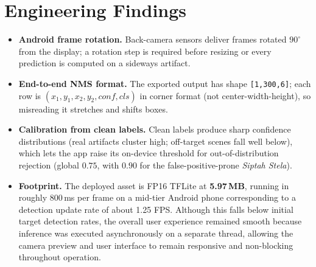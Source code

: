 \section{Engineering Findings}

\begin{itemize}[leftmargin=1.5em]
  \item \textbf{Android frame rotation.} Back-camera sensors deliver frames rotated
        $90^{\circ}$ from the display; a rotation step is required before resizing or
        every prediction is computed on a sideways artifact.
  \item \textbf{End-to-end NMS format.} The exported output has shape
        \texttt{[1,300,6]}; each row is $(x_1,y_1,x_2,y_2,\mathit{conf},\mathit{cls})$ in
        corner format (not center-width-height), so misreading it stretches and shifts boxes.
  \item \textbf{Calibration from clean labels.} Clean labels produce sharp confidence
        distributions (real artifacts cluster high; off-target scenes fall well below),
        which lets the app raise its on-device threshold for out-of-distribution
        rejection (global $0.75$, with $0.90$ for the false-positive-prone
        \emph{Siptah Stela}).
  \item \textbf{Footprint.} The deployed asset is FP16 TFLite at \textbf{5.97\,MB},
        running in roughly $800$\,ms per frame on a mid-tier Android phone corresponding to a detection update rate of about 1.25 FPS.
        Although this falls below initial target detection rates, the overall user experience remained smooth because inference was executed asynchronously on a separate thread,
        allowing the camera preview and user interface to remain responsive and non-blocking throughout operation.
\end{itemize}



